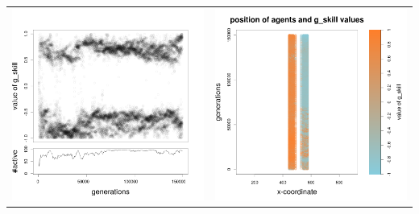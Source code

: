 \documentclass[a4paper,10pt]{article}
\begin{document}
\begin{table}[H]
\begin{tabular}{cc}
\newline
\includegraphics[width=\imgSize]{../images/5StaticEnv/Gplot8_staticEnv3}&\includegraphics[width=\imgSize]{../images/5StaticEnv/Gplot8Static_staticEnv3}\\
\end{tabular}
\end{table}
\end{document}
